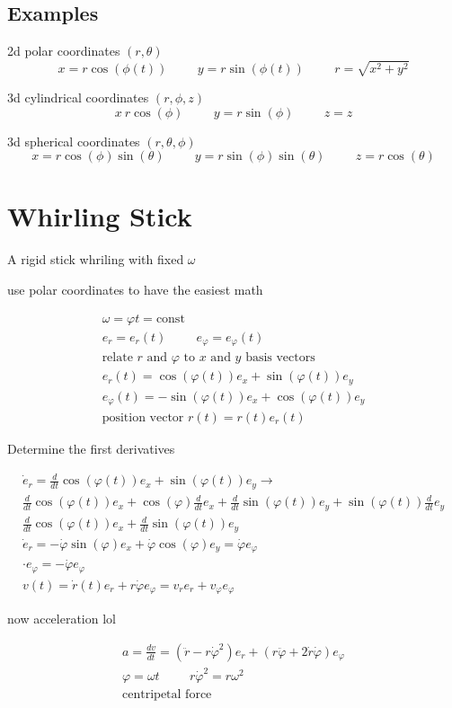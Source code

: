 \documentclass[fleqn]{report}
\newcommand{\hp}{\hspace{1cm}}
\newcommand{\equations} [1] {
\begin{gather*}
#1
\end{gather*}
}
\begin{document}
\subsection{Examples}
2d polar coordinates $(r, \theta)$
\[
x = r \cos(\phi(t)) \hp
y = r \sin(\phi(t))
\hp 
r = \sqrt{x^2 + y^2}
\]

3d cylindrical coordinates $(r, \phi, z)$
\[
x \ r \cos(\phi) \hp y = r \sin(\phi) \hp z = z
\]

3d spherical coordinates $(r, \theta, \phi)$
\[
x = r \cos(\phi) \sin(\theta)
\hp 
y = r \sin(\phi) \sin(\theta)
\hp 
z = r \cos(\theta) 
\]

\section{Whirling Stick}
A rigid stick whriling with fixed $\omega$

use polar coordinates to have the easiest math 
\equations{
    \omega = \varphi t = \textrm{const}
    \\
    e_r = e_r (t) \hp e_{\varphi} = e_{\varphi} (t)
    \\
    \textrm{relate $r$ and $\varphi$ to $x$ and $y$ basis vectors}
    \\
    e_r(t) = \cos(\varphi(t)) e_x + \sin(\varphi(t))e_y
    \\
    e_{\varphi}(t) = -\sin(\varphi(t)) e_x + \cos(\varphi(t)) e_y
    \\
    \textrm{position vector } r(t) = r(t) e_r(t)
}

Determine the first derivatives
\equations{
    \dot e_r = \frac{d}{dt}\cos(\varphi(t)) e_x + \sin(\varphi(t))e_y
    \rightarrow
    \\
    \frac{d}{dt}\cos(\varphi(t)) e_x + 
    \cos(\varphi) \frac{d}{dt}e_x + 
    \frac{d}{dt} \sin(\varphi(t))e_y + 
    \sin(\varphi(t)) \frac{d}{dt} e_y
    \\
    \frac{d}{dt}\cos(\varphi(t)) e_x + 
    \frac{d}{dt} \sin(\varphi(t))e_y 
    \\
    \dot e_r = - \dot \varphi \sin(\varphi) e_x + 
    \dot \varphi \cos(\varphi) e_y = \dot \varphi e_\varphi
    \\
    \cdot e_{\varphi} = - \dot \varphi e_{\varphi}
    \\
    v(t) = \dot r(t) e_r + r \dot \varphi e_\varphi
    =
    v_r e_r + v_\varphi e_\varphi 
}

now acceleration lol
\equations{
    a = \frac{dv}{dt} = 
    (\ddot r - r \dot \varphi^2) e_r + 
    (r \ddot \varphi + 2 \dot r \dot \varphi) e_{\varphi}
    \\
    \varphi = \omega t \hp r \dot \varphi^2  = r \omega^2
    \\
    \textrm{centripetal force}
}
\end{document}
